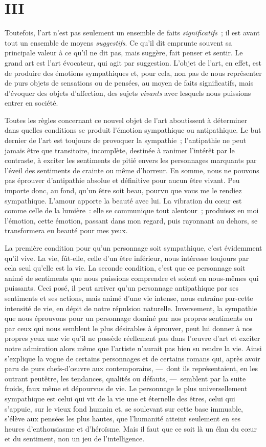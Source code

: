 \documentclass[french,twoside]{book} %
\begin{document}
\section[{III}]{III}
\noindent Toutefois, l’art n’est pas seulement un ensemble de faits \emph{significatifs} ; il est avant tout un ensemble de moyens \emph{suggestifs}. Ce qu’il dit emprunte souvent sa principale valeur à ce qu’il ne dit pas, mais suggère, fait penser et sentir. Le grand art est l’art évocateur, qui agit par suggestion. L’objet de l’art, en effet, est de produire des émotions sympathiques et, pour cela, non pas de nous représenter de purs objets de sensations ou de pensées, au moyen de faits significatifs, mais d’évoquer des objets d’affection, des sujets \emph{vivants} avec lesquels nous puissions entrer en société.\par
Toutes les règles concernant ce nouvel objet de l’art aboutissent à déterminer dans quelles conditions se produit l’émotion sympathique ou antipathique. Le but dernier de l’art est toujours de provoquer la sympathie ; l’antipathie ne peut jamais être que transitoire, incomplète, destinée à ranimer l’intérêt par le contraste, à exciter les sentiments de pitié envers les personnages marquants par l’éveil des sentiments de crainte ou même d’horreur. En somme, nous ne pouvons pas éprouver d’antipathie absolue et définitive pour aucun être vivant. Peu importe donc, au fond, qu’un être soit beau, pourvu que vous me le rendiez sympathique. L’amour apporte la beauté avec lui. La vibration du cœur est comme celle de la lumière : elle se communique tout alentour ; produisez en moi l’émotion, cette émotion, passant dans mon regard, puis rayonnant au dehors, se transformera eu beauté pour mes yeux.\par
La première condition pour qu’un personnage soit sympathique, c’est évidemment qu’il vive. La vie, fût-elle, celle d’un être inférieur, nous intéresse toujours par cela seul qu’elle est la vie. La seconde condition, c’est que ce personnage soit animé de sentiments que nous puissions comprendre et soient en nous-mêmes qui puissants. Ceci posé, il peut arriver qu’un personnage antipathique par ses sentiments et ses actions, mais animé d’une vie intense, nous entraîne par-cette intensité de vie, en dépit de notre répulsion naturelle. Inversement, la sympathie que nous éprouvons pour un personnage dominé par nos propres sentiments ou par ceux qui nous semblent le plus désirables à éprouver, peut lui donner à nos propres yeux une vie qu’il ne possède réellement pas dans l’œuvre d’art et exciter notre admiration alors même que l’artiste n’aurait pas bien su rendre la vie. Ainsi s’explique la vogue de certains personnages et de certains romans qui, après avoir paru de purs chefs-d’œuvre aux contemporains, — dont ils représentaient, en les outrant peutêtre, les tendances, qualités ou défauts, — semblent par la suite froids, faux même et dépourvus de vie. Le personnage le plus universellement sympathique est celui qui vit de la vie une et éternelle des êtres, celui qui s’appuie, sur le vieux fond humain et, se soulevant sur cette base immuable, s’élève aux pensées les plus hautes, que l’humanité atteint seulement en ses heures d’enthousiasme et d’héroïsme. Mais il faut que ce soit là un élan du cœur et du sentiment, non un jeu de l’intelligence.\par
\end{document}
